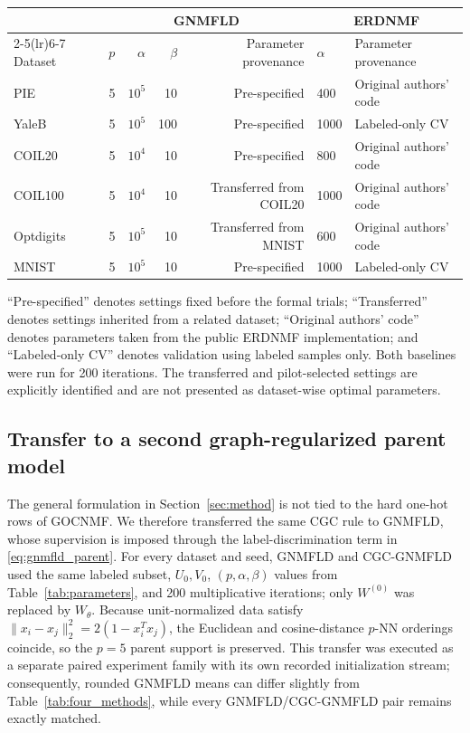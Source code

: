 \documentclass[11pt]{article}
\newenvironment{widetable}
  {\begin{strip}\centering\captionsetup{type=table}}
  {\end{strip}}
\theoremstyle{remark}
\begin{document}
\begin{widetable}
\centering
\caption{Parameters and provenance of the external baselines used in the unified comparison.}
\label{tab:parameters}
\small
\setlength{\tabcolsep}{16.7pt}
\begin{tabular}{lrrrrll}
\toprule
& \multicolumn{4}{c}{GNMFLD} & \multicolumn{2}{c}{ERDNMF} \\
\cmidrule(lr){2-5}\cmidrule(lr){6-7}
Dataset & $p$ & $\alpha$ & $\beta$ & Parameter provenance & $\alpha$ & Parameter provenance \\
\midrule
PIE & 5 & $10^5$ & 10 & Pre-specified & 400 & Original authors' code \\
YaleB & 5 & $10^5$ & 100 & Pre-specified & 1000 & Labeled-only CV \\
COIL20 & 5 & $10^4$ & 10 & Pre-specified & 800 & Original authors' code \\
COIL100 & 5 & $10^4$ & 10 & Transferred from COIL20 & 1000 & Original authors' code \\
Optdigits & 5 & $10^5$ & 10 & Transferred from MNIST & 600 & Original authors' code \\
MNIST & 5 & $10^5$ & 10 & Pre-specified & 1000 & Labeled-only CV \\
\bottomrule
\end{tabular}%

\vspace{1mm}
\parbox{0.98\linewidth}{\footnotesize ``Pre-specified'' denotes settings fixed before the formal trials; ``Transferred'' denotes settings inherited from a related dataset; ``Original authors' code'' denotes parameters taken from the public ERDNMF implementation; and ``Labeled-only CV'' denotes validation using labeled samples only. Both baselines were run for 200 iterations. The transferred and pilot-selected settings are explicitly identified and are not presented as dataset-wise optimal parameters.}
\end{widetable}
\subsection{Transfer to a second graph-regularized parent model}
\label{subsec:second_parent_transfer}

The general formulation in Section~\ref{sec:method} is not tied to the hard one-hot rows of GOCNMF. We therefore transferred the same CGC rule to GNMFLD, whose supervision is imposed through the label-discrimination term in \eqref{eq:gnmfld_parent}. For every dataset and seed, GNMFLD and CGC-GNMFLD used the same labeled subset, $U_0,V_0$, $(p,\alpha,\beta)$ values from Table~\ref{tab:parameters}, and 200 multiplicative iterations; only $W^{(0)}$ was replaced by $W_\theta$. Because unit-normalized data satisfy $\|x_i-x_j\|_2^2=2(1-x_i^Tx_j)$, the Euclidean and cosine-distance $p$-NN orderings coincide, so the $p=5$ parent support is preserved. This transfer was executed as a separate paired experiment family with its own recorded initialization stream; consequently, rounded GNMFLD means can differ slightly from Table~\ref{tab:four_methods}, while every GNMFLD/CGC-GNMFLD pair remains exactly matched.
\end{document}
